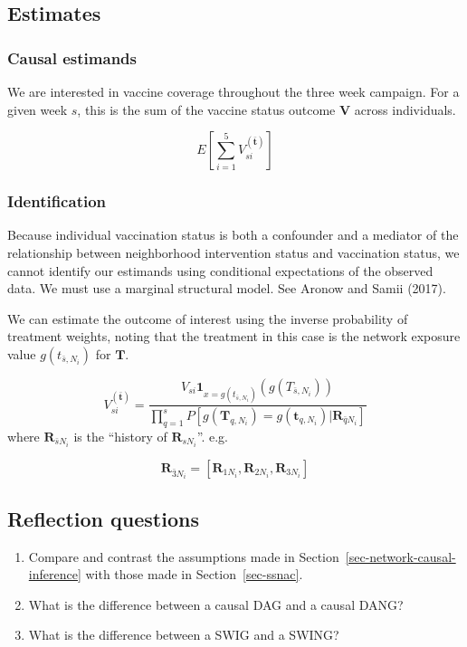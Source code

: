\documentclass[
  letterpaper,
  DIV=11,
  numbers=noendperiod,
  oneside]{scrreprt}
\begin{document}
\hypertarget{estimates}{%
\subsection{Estimates}\label{estimates}}

\hypertarget{causal-estimands}{%
\subsubsection{Causal estimands}\label{causal-estimands}}

We are interested in vaccine coverage throughout the three week
campaign. For a given week \(s\), this is the sum of the vaccine status
outcome \(\mathbf{V}\) across individuals.

\[
E[\sum_{i=1}^5 V_{si}^{(\bar{\mathbf{t}})}] 
\]

\hypertarget{identification-2}{%
\subsubsection{Identification}\label{identification-2}}

Because individual vaccination status is both a confounder and a
mediator of the relationship between neighborhood intervention status
and vaccination status, we cannot identify our estimands using
conditional expectations of the observed data. We must use a marginal
structural model. See Aronow and Samii (2017).

We can estimate the outcome of interest using the inverse probability of
treatment weights, noting that the treatment in this case is the network
exposure value \(g(t_{\bar{s},N_i})\) for \(\mathbf{T}\).

\[
V_{si}^{(\bar{\mathbf{t}})} =  \frac{V_{si} \mathbf{1}_{x = g(t_{\bar{s},N_i}) }(g(T_{\bar{s},N_i})) }{\prod_{q=1}^s P[g(\mathbf{T}_{q,N_i}) = g(\mathbf{t}_{q,N_i}) | \mathbf{R}_{\bar{q}N_i}]}
\] where \(\mathbf{R}_{\bar{s}N_i}\) is the ``history of
\(\mathbf{R}_{sN_i}\)''. e.g.

\[
\mathbf{R}_{\bar{3}N_i} = [\mathbf{R}_{1N_i}, \mathbf{R}_{2N_i}, \mathbf{R}_{3N_i}]
\]

\hypertarget{reflection-questions-2}{%
\subsection*{Reflection questions}\label{reflection-questions-2}}

\begin{enumerate}
\def\labelenumi{\arabic{enumi}.}
\item
  Compare and contrast the assumptions made in
  Section~\ref{sec-network-causal-inference} with those made in
  Section~\ref{sec-ssnac}.
\item
  What is the difference between a causal DAG and a causal DANG?
\item
  What is the difference between a SWIG and a SWING?
\end{enumerate}
\end{document}
